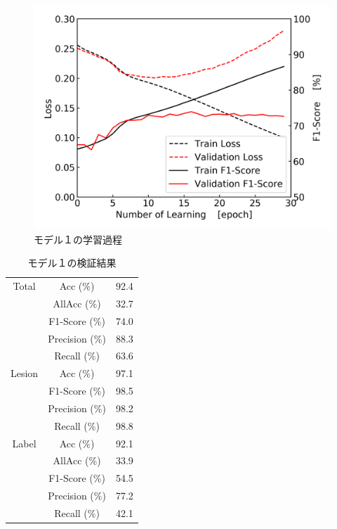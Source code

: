 \begin{figure}[htbp]
    \begin{center}
        \includegraphics[width=150mm]{./fig/densenet121process.png}
        \caption{モデル１の学習過程}
        \label{fig:densenet121_result_process}
    \end{center}
\end{figure}

\begin{table}[tb]
    \caption[]{モデル１の検証結果}
    \label{tb:densenet121}
    \centering
    \normalsize
    \begin{tabular}{c|c|r} \hline
        Total & Acc (\%) & 92.4 \\ \cline{2-3}
         & AllAcc (\%) & 32.7 \\ \cline{2-3}
         & F1-Score (\%) & 74.0 \\ \cline{2-3}
         & Precision (\%) & 88.3 \\ \cline{2-3}
         & Recall (\%) & 63.6 \\ \hline
        Lesion & Acc (\%) & 97.1 \\ \cline{2-3}
         & F1-Score (\%) & 98.5 \\ \cline{2-3}
         & Precision (\%) & 98.2 \\ \cline{2-3}
         & Recall (\%) & 98.8 \\ \hline
        Label & Acc (\%) & 92.1 \\ \cline{2-3}
         & AllAcc (\%) & 33.9 \\ \cline{2-3}
         & F1-Score (\%) & 54.5 \\ \cline{2-3}
         & Precision (\%) & 77.2 \\ \cline{2-3}
         & Recall (\%) & 42.1 \\ \hline
    \end{tabular}
\end{table}

